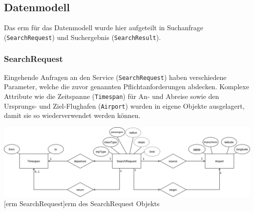 \documentclass[12pt,twoside,a4paper]{article}
\begin{document}
\subsection{Datenmodell}
Das \acrlong{erm} für das Datenmodell wurde hier aufgeteilt in Suchanfrage (\texttt{SearchRequest}) und Suchergebnis (\texttt{SearchResult}).
\subsubsection{SearchRequest}
Eingehende Anfragen an den Service (\texttt{SearchRequest}) haben verschiedene Parameter, welche die zuvor genannten Pflichtanforderungen abdecken. Komplexe Attribute wie die Zeitspanne (\texttt{Timespan}) für An- und Abreise sowie den Ursprungs- und Ziel-Flughafen (\texttt{Airport}) wurden in eigene Objekte ausgelagert, damit sie so wiederverwendet werden können.
\begin{center}
	\captionsetup{type=figure}
	\includegraphics[width=\textwidth]{images/datamodel-SearchRequest}
	[\acrshort{erm} SearchRequest]{\acrlong{erm} des SearchRequest Objekts}
\end{center}
\end{document}
